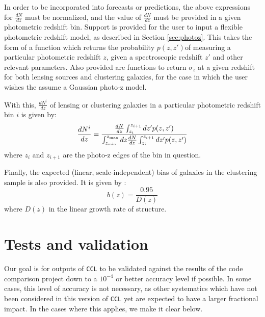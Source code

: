 \documentclass[\docopts]{\docclass}
\begin{document}
In order to be incorporated into forecasts or predictions, the above expressions for $\frac{dN}{dz}$ must be normalized, and the value of $\frac{dN}{dz}$ must be provided in a given photometric redshift bin. Support is provided for the user to input a flexible photometric redshift model, as described in Section \ref{sec:photoz}. This takes the form of a function which returns the probability $p(z,z')$of measuring a particular photometric redshift $z$, given a spectroscopic redshift $z'$ and other relevant parameters. Also provided are functions to return $\sigma_z$ at a given redshift for both lensing sources and clustering galaxies, for the case in which the user wishes the assume a Gaussian photo-z model.

With this, $\frac{dN^i}{dz}$ of lensing or clustering galaxies in a particular photometric redshift bin $i$ is given by:
\begin{equation}
\frac{dN^i}{dz} = \frac{\frac{dN}{dz}\int_{z_i}^{z_{i+1}} dz' p(z,z')}{\int_{z_{\rm min}}^{z_{\rm max}}dz \frac{dN}{dz} \int_{z_i}^{z_{i+1}}dz' p(z, z')}
\label{photoz}
\end{equation}
where $z_{i}$ and $z_{i+1}$ are the photo-z edges of the bin in question.

Finally, the expected (linear, scale-independent) bias of galaxies in the clustering sample is also provided. It is given by \cite{ScienceBook}:
\begin{equation}
b(z) = \frac{0.95}{D(z)}
\label{clustbias}
\end{equation}
where $D(z)$ in the linear growth rate of structure.

\section{Tests and validation}
\label{sec:tests}

Our goal is for outputs of {\tt CCL} to be validated against the results of the code comparison project down to a $10^{-4}$ or better accuracy level if possible. In some cases, this level of accuracy is not necessary, as other systematics which have not been considered in this version of {\tt CCL} yet are expected to have a larger fractional impact. In the cases where this applies, we make it clear below.
\end{document}
